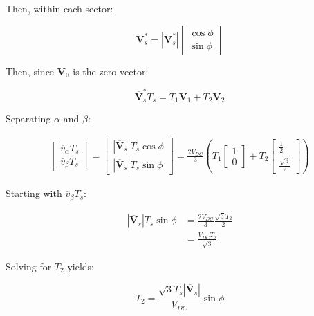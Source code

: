 \documentclass{article}
\begin{document}
Then, within each sector:

\begin{equation}
    \mathbf{V}_s^* = |\mathbf{V}_s^*|
    \begin{bmatrix}
        \cos\phi \\
        \sin\phi
    \end{bmatrix}
\end{equation}

Then, since $\mathbf{V}_0$ is the zero vector:

\begin{equation}
    \overline{\mathbf{V}}_s^*T_s = T_1\mathbf{V}_1 + T_2\mathbf{V}_2
\end{equation}

Separating $\alpha$ and $\beta$:

\begin{align}
    \begin{bmatrix}
        \overline{v}_\alpha T_s \\
        \overline{v}_\beta T_s
    \end{bmatrix}
    =
    \begin{bmatrix}
        |\overline{\mathbf{V}}_s|T_s\cos\phi \\
        |\overline{\mathbf{V}}_s|T_s\sin\phi
    \end{bmatrix}
    = \frac{2V_{DC}}{3} \left(
        T_1
    \begin{bmatrix}
        1 \\
        0
    \end{bmatrix}
    +
    T_2
    \begin{bmatrix}
        \frac{1}{2} \\
        \frac{\sqrt{3}}{2}
    \end{bmatrix}
    \right)
\end{align}

Starting with $\overline{v}_\beta T_s$:

\begin{align}
    |\overline{\mathbf{V}}_s|T_s\sin\phi 
    &= \frac{2V_{DC}}{3}\frac{\sqrt{3}T_2}{2} \\
    &= \frac{V_{DC}T_2}{\sqrt{3}}
\end{align}

Solving for $T_2$ yields:

\begin{equation}
    T_2 = \frac{\sqrt{3}T_s|\overline{\mathbf{V}}_s|}{V_{DC}}\sin\phi
\end{equation}
\end{document}

